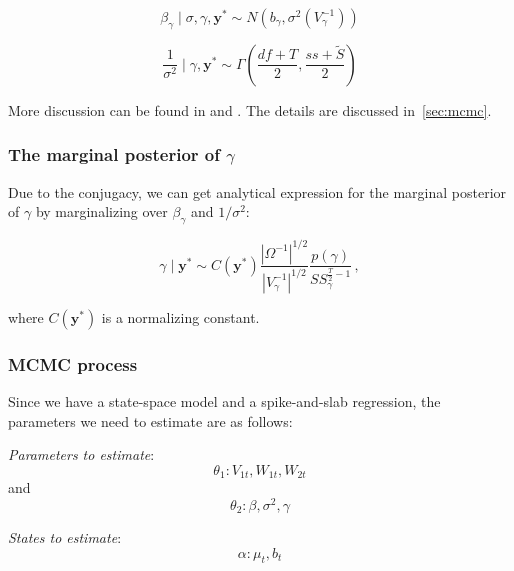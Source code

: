 $$\beta_{\gamma} \mid \sigma, \gamma, \mathbf{y}^*  \sim  N(b_{\gamma}, \sigma^2(V_{\gamma}^{-1}))$$  






$$\frac {1}{\sigma^{2}} \mid \gamma, \mathbf{y}^* \sim  \Gamma(\frac{df+T}{2}, \frac{ss + \tilde{S}}{2})$$  




More discussion can be found in  and   . The details are discussed in~\cref{sec:mcmc}.



\subsubsection{The marginal posterior of $\gamma$}



Due to the conjugacy, we can get analytical expression for the marginal posterior of $\gamma$ by marginalizing over  $\beta_{\gamma}$ and ${1}/{\sigma^{2}}$:




$$\gamma \mid \mathbf{y}^* \sim C(\mathbf{y}^*) \frac{|\Omega^{-1}|^{1/2}}{|V_{\gamma}^{-1}|^{1/2}} \frac{p(\gamma)}{SS_{\gamma}^{\frac{T}{2} -1}} \, ,$$




where $C(\mathbf{y}^*)$ is a normalizing constant. 



\subsubsection{MCMC process}






Since we have a  state-space model and a spike-and-slab regression, the parameters we need to  estimate are as follows: 







\textit{Parameters to estimate}: $$\theta_1: 	V_{1t}, W_{1t}, W_{2t}$$ and $$\theta_2: \beta, \sigma^2,  \gamma$$







\textit{States to estimate}: $$\alpha:  \mu_t, b_t$$





